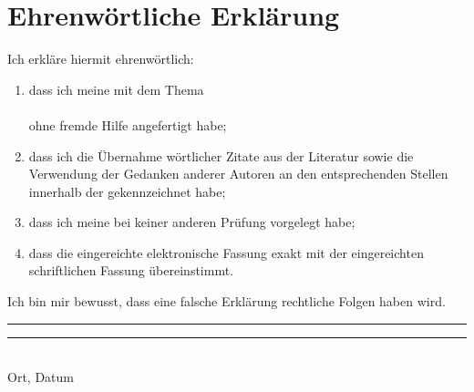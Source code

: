 \documentclass[fontsize=12pt,listof=totoc]{scrreprt}
\newif\ifglossary
\newif\ifroman
\newcommand{\Textpath}{../text/text.tex}
\begin{document}
	\iftotaltables
		\listoftables
	\fi

	\ifroman
		\newpage
		\newcounter{lastroman}
		\setcounter{lastroman}{\value{page}}
		\pagenumbering{arabic}
	\fi
	
	
	\ifroman
		\newpage
		\pagenumbering{Roman}
		\setcounter{page}{\value{lastroman}}
	\fi
	\ifglossary
		\printglossaries
	\fi

	\printbibliography[heading=bibintoc]{}
		
	\newpage
	\hypertarget{decl}{}
	\chapter*{Ehrenwörtliche Erklärung}
		\thispagestyle{empty}
		Ich erkläre hiermit ehrenwörtlich:
		\renewcommand{\theenumi}{\arabic{enumi})}
		\renewcommand\labelenumi{\theenumi}
		\begin{enumerate}
			\item dass ich meine \Arbeitstyp{} mit dem Thema \\
				\textbf{\Titel} \\
				ohne fremde Hilfe angefertigt habe; 
			\item dass ich die Übernahme wörtlicher Zitate aus der Literatur sowie die Verwendung der Gedanken anderer Autoren an den entsprechenden Stellen innerhalb der \Arbeitstyp{} gekennzeichnet habe;
			\item dass ich meine \Arbeitstyp{} bei keiner anderen Prüfung vorgelegt habe;
			\item dass die eingereichte elektronische Fassung exakt mit der eingereichten schriftlichen Fassung übereinstimmt.\\
		\end{enumerate} 
		Ich bin mir bewusst, dass eine falsche Erklärung rechtliche Folgen haben wird.
		\vfill
		\noindent
		\rule[-7px]{120px}{.4pt}\hfill\rule[-7px]{120px}{.4pt}\\
		Ort, Datum\hfill{}
\end{document}
